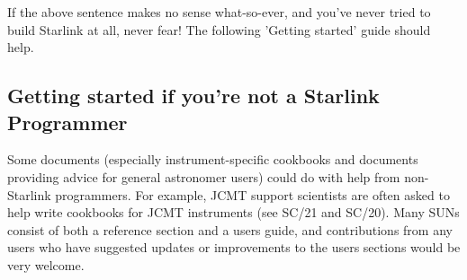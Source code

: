 \documentclass[twoside,11pt,nolof]{starlink}
\begin{document}
If the above sentence makes no sense what-so-ever, and you've never
tried to build Starlink at all, never fear! The following
'Getting started' guide should help.

\subsection{Getting started if you're not a Starlink Programmer}

Some documents (especially instrument-specific cookbooks and documents
providing advice for general astronomer users) could do with help from
non-Starlink programmers. For example, JCMT support scientists are
often asked to help write cookbooks for JCMT instruments (see SC/21
and SC/20). Many SUNs consist of both a reference section and a users
guide, and contributions from any users who have suggested updates or
improvements to the users sections would be very welcome.
\end{document}
